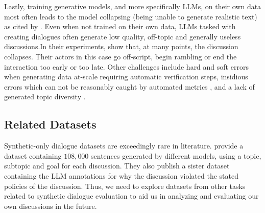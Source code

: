 Lastly, training generative models, and more specifically LLMs, on their own data most often leads to the model collapsing (being unable to generate realistic text) \cite{alemohammad2023selfconsuminggenerativemodelsmad, shumailov2024curserecursiontraininggenerated} as cited by \citet{ulmer2024bootstrappingllmbasedtaskorienteddialogue}. Even when not trained on their own data, LLMs tasked with creating dialogues often generate low quality, off-topic and generally useless discussions.In their experiments, \citet{ulmer2024bootstrappingllmbasedtaskorienteddialogue} show that, at many points, the discussion collapses. Their actors in this case go off-script, begin rambling or end the interaction too early or too late. Other challenges include hard and soft errors when generating data at-scale \cite{lambert2024selfdirectedsyntheticdialoguesrevisions, ulmer2024bootstrappingllmbasedtaskorienteddialogue} requiring automatic verification steps, insidious errors which can not be reasonably caught by automated metrics \cite{lambert2024selfdirectedsyntheticdialoguesrevisions, ulmer2024bootstrappingllmbasedtaskorienteddialogue}, and a lack of generated topic diversity \cite{lambert2024selfdirectedsyntheticdialoguesrevisions}.


\subsection{Related Datasets}
\label{sec:related:datasets}

Synthetic-only dialogue datasets are exceedingly rare in literature. \cite{lambert2024selfdirectedsyntheticdialoguesrevisions} provide a dataset containing  $108,000$ sentences generated by different models, using a topic, subtopic and goal for each discussion. They also publish a sister dataset containing the LLM annotations for why the discussion violated the stated policies of the discussion. Thus, we need to explore datasets from other tasks related to synthetic dialogue evaluation to aid us in analyzing and evaluating our own discussions in the future.

